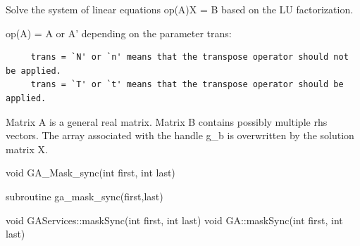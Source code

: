 \documentclass[12pt]{article}
\begin{document}
\gcoll

\begin{desc}

Solve the system of linear equations op(A)X = B based on the LU factorization.

op(A) = A or A' depending on the parameter trans:
\begin{verbatim}
     trans = `N' or `n' means that the transpose operator should not be applied.
     trans = `T' or `t' means that the transpose operator should be applied.
\end{verbatim}

Matrix A is a general real matrix. Matrix B contains possibly multiple rhs
vectors.  The array associated with the handle g_b is overwritten by the
solution matrix X.

\end{desc}


\begin{capi}
\begin{ccode}
void GA_Mask_sync(int first, int last)
\end{ccode}
\begin{funcargs}
\end{funcargs}
\end{capi}

\begin{fapi}
\begin{fcode}
subroutine ga_mask_sync(first,last)
\end{fcode}
\begin{funcargs}
\end{funcargs}
\end{fapi}

\begin{cxxapi}
\begin{cxxcode}
void GAServices::maskSync(int first, int last)
void GA::maskSync(int first, int last)
\end{cxxcode}
\begin{funcargs}
\end{funcargs}
\end{cxxapi}
\end{document}
